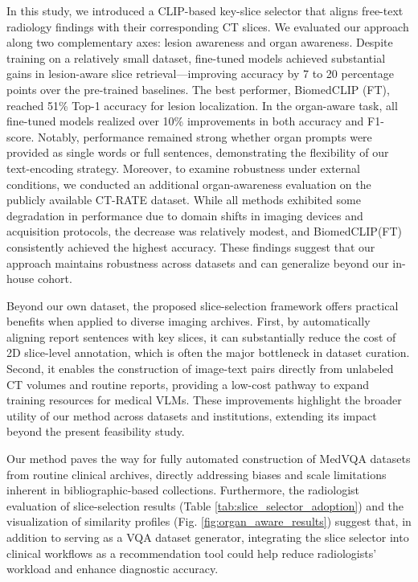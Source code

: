 \documentclass[bioengineering,article,submit,pdftex,moreauthors]{Definitions/mdpi}
\begin{document}
In this study, we introduced a CLIP-based key-slice selector that aligns free-text radiology findings with their corresponding CT slices. 
We evaluated our approach along two complementary axes: lesion awareness and organ awareness. 
Despite training on a relatively small dataset, fine-tuned models achieved substantial gains in lesion-aware slice retrieval—improving accuracy by 7 to 20 percentage points over the pre-trained baselines. 
The best performer, BiomedCLIP (FT), reached 51\% Top-1 accuracy for lesion localization. 
In the organ-aware task, all fine-tuned models realized over 10\% improvements in both accuracy and F1-score. 
Notably, performance remained strong whether organ prompts were provided as single words or full sentences, demonstrating the flexibility of our text-encoding strategy. 
Moreover, to examine robustness under external conditions, we conducted an additional organ-awareness evaluation on the publicly available CT-RATE dataset. 
While all methods exhibited some degradation in performance due to domain shifts in imaging devices and acquisition protocols, the decrease was relatively modest, and BiomedCLIP(FT) consistently achieved the highest accuracy. 
These findings suggest that our approach maintains robustness across datasets and can generalize beyond our in-house cohort.

Beyond our own dataset, the proposed slice-selection framework offers practical benefits when applied to diverse imaging archives. 
First, by automatically aligning report sentences with key slices, it can substantially reduce the cost of 2D slice-level annotation, which is often the major bottleneck in dataset curation. 
Second, it enables the construction of image-text pairs directly from unlabeled CT volumes and routine reports, providing a low-cost pathway to expand training resources for medical VLMs. 
These improvements highlight the broader utility of our method across datasets and institutions, extending its impact beyond the present feasibility study.

Our method paves the way for fully automated construction of MedVQA datasets from routine clinical archives, directly addressing biases and scale limitations inherent in bibliographic-based collections. 
Furthermore, the radiologist evaluation of slice-selection results (Table \ref{tab:slice_selector_adoption}) and the visualization of similarity profiles (Fig. \ref{fig:organ_aware_results}) suggest that, in addition to serving as a VQA dataset generator, integrating the slice selector into clinical workflows as a recommendation tool could help reduce radiologists’ workload and enhance diagnostic accuracy. 
\end{document}
